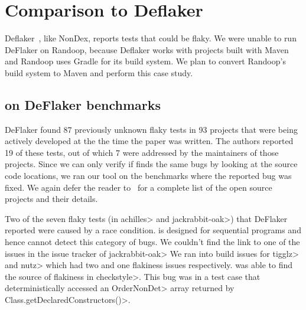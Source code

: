 \section{Comparison to Deflaker}
Deflaker~\cite{deflaker}, like NonDex, reports tests that could be flaky. 
We were unable to run DeFlaker on Randoop, because Deflaker works with projects built with Maven and Randoop
uses Gradle for its build system. We plan to convert Randoop's build system to Maven and
perform this case study.

\subsection{\TheDeterminismChecker on DeFlaker benchmarks}\label{sec:deflaker-benchmarks}
DeFlaker found 87 previously unknown flaky tests in 93 projects that were being actively developed at the the time
the paper was written. The authors reported 19 of these tests, out of which 7 were addressed by the maintainers of
those projects. Since we can only verify if \TheDeterminismChecker finds the same bugs by looking at the source code
locations, we ran our tool on the benchmarks where the reported bug was fixed. We again defer the reader to~\cite{deflaker}
for a complete list of the open source projects and their details.

Two of the seven flaky tests (in \<achilles> and \<jackrabbit-oak>) that DeFlaker reported were caused by a race condition. \TheDeterminismChecker
is designed for sequential programs and hence cannot detect this category of bugs.  
We couldn't find the link to one of the issues in the issue tracker of \<jackrabbit-oak>
We ran into build issues
for \<tigglz> and \<nutz> which had two and one flakiness issues respectively. 
\TheDeterminismChecker was able to find the source of flakiness in \<checkstyle>. This bug was in a test
case that deterministically accessed an \<OrderNonDet> array returned by \<Class.getDeclaredConstructors()>.
